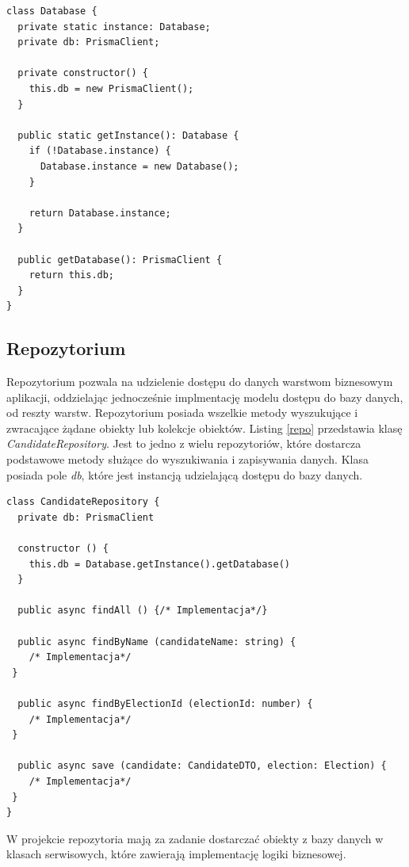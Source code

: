 \documentclass[a4paper,12pt]{book}
\begin{document}
\begin{lstlisting}[style=ES6, caption={Klasa \textit{Database}. Singleton.}, label={singleton}]
class Database {
  private static instance: Database;
  private db: PrismaClient;

  private constructor() {
    this.db = new PrismaClient();
  }

  public static getInstance(): Database {
    if (!Database.instance) {
      Database.instance = new Database();
    }

    return Database.instance;
  }

  public getDatabase(): PrismaClient {
    return this.db;
  }
}
\end{lstlisting}

\subsection{Repozytorium}

Repozytorium pozwala na udzielenie dostępu do danych warstwom biznesowym aplikacji, oddzielając jednocześnie implmentację modelu dostępu do bazy danych, od reszty warstw. Repozytorium posiada wszelkie metody wyszukujące i zwracające żądane obiekty lub kolekcje obiektów. Listing \ref{repo} przedstawia klasę \textit{CandidateRepository}. Jest to jedno z wielu repozytoriów, które dostarcza podstawowe metody służące do wyszukiwania i zapisywania danych. Klasa posiada pole \textit{db}, które jest instancją udzielającą dostępu do bazy danych.

\begin{lstlisting}[style=ES6, caption={Klasa \textit{CandidateRepository}.}, label={repo}]
class CandidateRepository {
  private db: PrismaClient

  constructor () {
    this.db = Database.getInstance().getDatabase()
  }

  public async findAll () {/* Implementacja*/}

  public async findByName (candidateName: string) {
	/* Implementacja*/
 }

  public async findByElectionId (electionId: number) {
	/* Implementacja*/
 }

  public async save (candidate: CandidateDTO, election: Election) {
	/* Implementacja*/
 }
}
\end{lstlisting}

W projekcie repozytoria mają za zadanie dostarczać obiekty z bazy danych w klasach serwisowych, które zawierają implementację logiki biznesowej.
\end{document}
